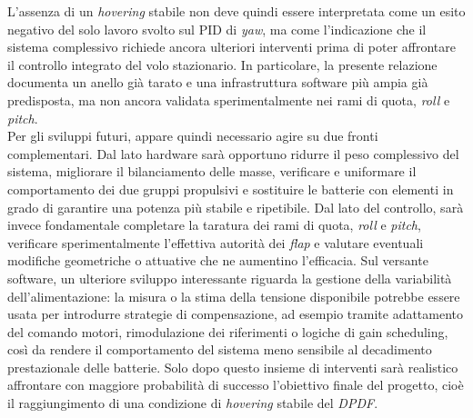 \documentclass[11pt]{report}
\begin{document}
	L'assenza di un \textit{hovering} stabile non deve quindi essere interpretata come un esito negativo del solo lavoro svolto sul PID di \textit{yaw}, ma come l'indicazione che il sistema complessivo richiede ancora ulteriori interventi prima di poter affrontare il controllo integrato del volo stazionario. In particolare, la presente relazione documenta un anello già tarato e una infrastruttura software più ampia già predisposta, ma non ancora validata sperimentalmente nei rami di quota, \textit{roll} e \textit{pitch}.\\
	Per gli sviluppi futuri, appare quindi necessario agire su due fronti complementari. Dal lato hardware sarà opportuno ridurre il peso complessivo del sistema, migliorare il bilanciamento delle masse, verificare e uniformare il comportamento dei due gruppi propulsivi e sostituire le batterie con elementi in grado di garantire una potenza più stabile e ripetibile. Dal lato del controllo, sarà invece fondamentale completare la taratura dei rami di quota, \textit{roll} e \textit{pitch}, verificare sperimentalmente l'effettiva autorità dei \textit{flap} e valutare eventuali modifiche geometriche o attuative che ne aumentino l'efficacia. Sul versante software, un ulteriore sviluppo interessante riguarda la gestione della variabilità dell'alimentazione: la misura o la stima della tensione disponibile potrebbe essere usata per introdurre strategie di compensazione, ad esempio tramite adattamento del comando motori, rimodulazione dei riferimenti o logiche di gain scheduling, così da rendere il comportamento del sistema meno sensibile al decadimento prestazionale delle batterie. Solo dopo questo insieme di interventi sarà realistico affrontare con maggiore probabilità di successo l'obiettivo finale del progetto, cioè il raggiungimento di una condizione di \textit{hovering} stabile del \textit{DPDF}.
	
	
	
\end{document}
